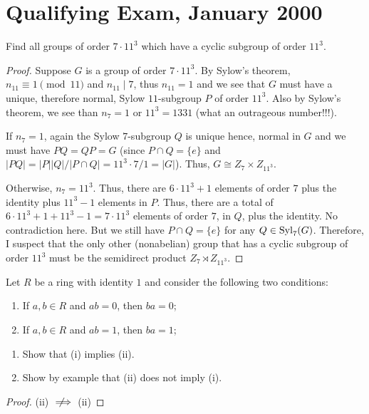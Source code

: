 \chapter{Qualifying Exam, January 2000}
\begin{problem}
Find all groups of order $7\cdot 11^3$ which have a cyclic subgroup of
order $11^3$.
\end{problem}
\begin{proof}
Suppose $G$ is a group of order $7\cdot 11^3$. By Sylow's theorem,
$n_{11}\equiv 1\pmod{11}$ and $n_{11}\mid 7$, thus $n_{11}=1$ and we see
that $G$ must have a unique, therefore normal, Sylow $11$-subgroup $P$ of
order $11^3$. Also by Sylow's theorem, we see than $n_7=1$ or $11^3=1331$
(what an outrageous number!!!).

If $n_7=1$, again the Sylow $7$-subgroup $Q$ is unique hence, normal in $G$
and we must have $PQ=QP=G$ (since $P\cap Q=\{e\}$ and
$|PQ|=|P||Q|/|P\cap Q|=11^3\cdot 7/1=|G|$). Thus,
$G\cong Z_7\times Z_{11^3}$.

Otherwise, $n_7=11^3$. Thus, there are $6\cdot 11^3+1$ elements of order
$7$ plus the identity plus $11^3-1$ elements in $P$. Thus, there are a
total of $6\cdot 11^3+1+11^3-1=7\cdot 11^3$ elements of order $7$, in $Q$,
plus the identity. No contradiction here. But we still have $P\cap Q=\{e\}$
for any $Q\in\operatorname{Syl}_7(G)$. Therefore, I suspect that the only other
(nonabelian) group that has a cyclic subgroup of order $11^3$ must be the
semidirect product $Z_7\rtimes Z_{11^3}$.
\end{proof}

\begin{problem}
Let $R$ be a ring with identity $1$ and consider the following two
conditions:
\begin{center}
\begin{enumerate}[label=(\roman*)]
\item If $a,b\in R$ and $ab=0$, then $ba=0$;
\item If $a,b\in R$ and $ab=1$, then $ba=1$;
\end{enumerate}
\end{center}
\begin{enumerate}[label=(\alph*)]
\item Show that (i) implies (ii).
\item Show by example that (ii) does not imply (i).
\end{enumerate}
\end{problem}
\begin{proof}

(ii) $\nimplies$ (ii)
\end{proof}

